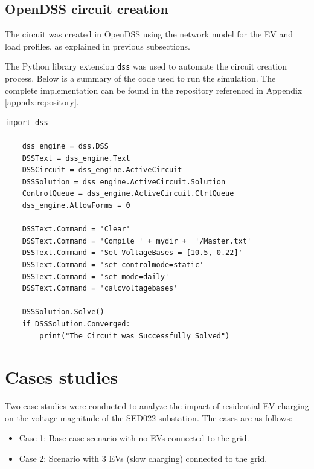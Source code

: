 \documentclass[12pt, 3p]{elsarticle}
\begin{document}
\subsection{OpenDSS circuit creation}

The circuit was created in OpenDSS \cite{opendss} using the network 
model for the EV and load profiles, as explained in 
previous subsections. 

The Python library extension \texttt{dss} \cite{opendss_python} was 
used to automate the circuit creation process. Below is a summary of 
the code used to run the simulation. The complete implementation can 
be found in the repository referenced in Appendix \ref{appndx:repository}.

\begin{lstlisting}[caption={Python code to interact with OpenDSS}]
    import dss

    dss_engine = dss.DSS
    DSSText = dss_engine.Text                                                      
    DSSCircuit = dss_engine.ActiveCircuit                                            
    DSSSolution = dss_engine.ActiveCircuit.Solution                                  
    ControlQueue = dss_engine.ActiveCircuit.CtrlQueue                                           
    dss_engine.AllowForms = 0
    
    DSSText.Command = 'Clear'                             
    DSSText.Command = 'Compile ' + mydir +  '/Master.txt'    
    DSSText.Command = 'Set VoltageBases = [10.5, 0.22]'
    DSSText.Command = 'set controlmode=static'
    DSSText.Command = 'set mode=daily' 
    DSSText.Command = 'calcvoltagebases'
    
    DSSSolution.Solve()
    if DSSSolution.Converged:
        print("The Circuit was Successfully Solved")
\end{lstlisting}

\section{Cases studies}\label{sec:cases}

Two case studies were conducted to analyze the impact of
residential EV charging on the voltage magnitude of the
SED022 substation. The cases are as follows:

\begin{itemize}
    \item Case 1: Base case scenario with no EVs connected to the grid.
    \item Case 2: Scenario with 3 EVs (slow charging) connected to the grid.
\end{itemize}
\end{document}
